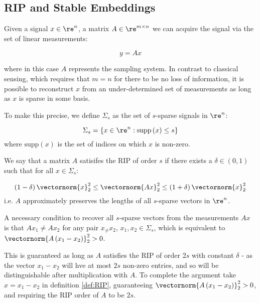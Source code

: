\subsection{RIP and Stable Embeddings}
Given a signal \(x \in \re^n\), a matrix \(A \in \re^{m \times n}\) we can acquire the signal via the set of linear measurements:

\begin{equation}
y = Ax
\end{equation}

where in this case \(A\) represents the sampling system. In contrast to classical sensing, which requires that \(m = n\) for there to be no loss of information, it is possible to reconstruct \(x\) from an under-determined set of measurements as long as \(x\) is sparse in some basis. 

To make this precise, we define \(\Sigma_s\) as the set of \(s\)-sparse signals in \(\re^n\):

\begin{definition}
\begin{equation}
\Sigma_s = \{ x \in \re^n : \mathrm{supp}\left(x\right) \leq s\}
\end{equation}
where \(\mathrm{supp}\left(x\right) \) is the set of indices on which \(x\) is non-zero.
\end{definition}

\begin{definition}[RIP]
We say that a matrix \(A\) satisifes the RIP of order \(s\) if there exists a \(\delta \in \left(0, 1\right)\) such that for all \(x \in \Sigma_s\):

\begin{equation}
\left(1 - \delta\right) \vectornorm{x}_2^2 \leq \vectornorm{Ax}_2^2 \leq \left(1 + \delta\right) \vectornorm{x}_2^2
\end{equation}
i.e. \(A\) approximately preserves the lengths of all \(s\)-sparse vectors in \(\re^n\). 
\label{def:RIP}
\end{definition}

\begin{remark} 
A necessary condition to recover all \(s\)-sparse vectors from the measurements \(Ax\) is that \(Ax_1 \neq Ax_2\) for any pair \( x_ \neq x_2\), \(x_1, x_2 \in \Sigma_s\), which is equivalent to \(\vectornorm{A\left(x_1 - x_2\right)}_2^2 > 0\). 

This is guaranteed as long as \(A\) satisfies the RIP of order 2\(s\) with constant \(\delta\) - as the vector \(x_1 - x_2\) will hve at most \(2s\) non-zero entries, and so will be distinguishable after multiplication with \(A\). To complete the argument take \(x = x_1 - x_2\) in definition \eqref{def:RIP}, guaranteeing \(\vectornorm{A\left(x_1 - x_2\right)}_2^2 > 0 \), and requiring the RIP order of \(A\) to be \(2s\).
\end{remark}

